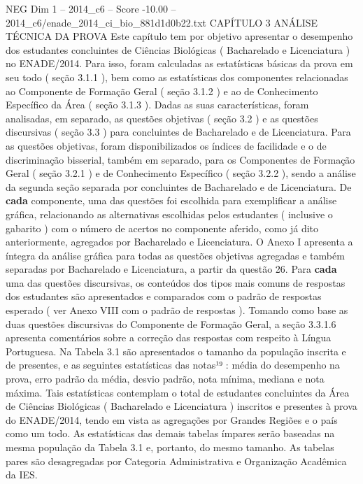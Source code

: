 \begin{textsample}{NEG Dim 1 – 2014\_c6 – Score -10.00 – 2014\_c6/enade\_2014\_ci\_bio\_881d1d0b22.txt}  \label{ex:f1_neg_007}
CAPÍTULO 3 ANÁLISE TÉCNICA DA PROVA Este capítulo tem por objetivo apresentar o desempenho dos estudantes concluintes de Ciências Biológicas ( Bacharelado e Licenciatura ) no ENADE/2014.
Para isso, foram calculadas as estatísticas básicas da prova em seu todo ( seção 3.1.1 ), bem como as estatísticas dos componentes relacionadas ao Componente de Formação Geral ( seção 3.1.2 ) e ao de Conhecimento Específico da Área ( seção 3.1.3 ).
Dadas as suas características, foram analisadas, em separado, as questões objetivas ( seção 3.2 ) e as questões discursivas ( seção 3.3 ) para concluintes de Bacharelado e de Licenciatura.
Para as questões objetivas, foram disponibilizados os índices de facilidade e o de discriminação bisserial, também em separado, para os Componentes de Formação Geral ( seção 3.2.1 ) e de Conhecimento Específico ( seção 3.2.2 ), sendo a análise da segunda seção separada por concluintes de Bacharelado e de Licenciatura.
De \textbf{cada} componente, uma das questões foi escolhida para exemplificar a análise gráfica, relacionando as alternativas escolhidas pelos estudantes ( inclusive o gabarito ) com o número de acertos no componente aferido, como já dito anteriormente, agregados por Bacharelado e Licenciatura.
O Anexo I apresenta a íntegra da análise gráfica para todas as questões objetivas agregadas e também separadas por Bacharelado e Licenciatura, a partir da questão 26.
Para \textbf{cada} uma das questões discursivas, os conteúdos dos tipos mais comuns de respostas dos estudantes são apresentados e comparados com o padrão de respostas esperado ( ver Anexo VIII com o padrão de respostas ).
Tomando como base as duas questões discursivas do Componente de Formação Geral, a seção 3.3.1.6 apresenta comentários sobre a correção das respostas com respeito à Língua Portuguesa.
Na Tabela 3.1 são apresentados o tamanho da população inscrita e de presentes, e as seguintes estatísticas das notas¹⁹ : média do desempenho na prova, erro padrão da média, desvio padrão, nota mínima, mediana e nota máxima.
Tais estatísticas contemplam o total de estudantes concluintes da Área de Ciências Biológicas ( Bacharelado e Licenciatura ) inscritos e presentes à prova do ENADE/2014, tendo em vista as agregações por Grandes Regiões e o país como um todo.
As estatísticas das demais tabelas ímpares serão baseadas na mesma população da Tabela 3.1 e, portanto, do mesmo tamanho.
As tabelas pares são desagregadas por Categoria Administrativa e Organização Acadêmica da IES.

\end{textsample}
